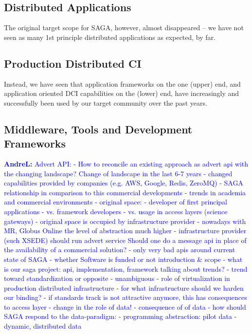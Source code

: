 \documentclass{article}
\newcommand{\B}[1]{\textbf{#1}}
\newcommand{\alnote}[1]{{\textcolor{blue}{    \B{AndreL:  } #1 }}}
\newcommand{\alnote}[1]{}
\begin{document}
\subsection{Distributed Applications}

The original target scope for SAGA, however, almost disappeared -- we
have not seen as many 1st principle distributed applications as
expected, by far.


\subsection{Production Distributed CI}

Instead, we have seen that application frameworks on the one (upper)
end, and application oriented DCI capabilities on the (lower) end,
have increasingly and successfully been used by our target community
over the past years.


\subsection{Middleware, Tools and Development Frameworks}

\alnote{Advert API: - How to reconcile an existing approach as advert
  api with the changing landscape?  Change of landscape in the last
  6-7 years - changed capabilities provided by companies (e.g. AWS,
  Google, Redis, ZeroMQ) - SAGA relationship in comparison to this
  commercial developments - trends in academia and commercial
  environments - original space: - developer of first principal
  applications - vs. framework developers - vs. usage in access layers
  (science gateways) - original space is occupied by infrastructure
  provider - nowadays with MR, Globus Online the level of abstraction
  much higher - infrastructure provider (such XSEDE) should run advert
  service Should one do a message api in place of the availability of
  a commercial solution?  - only very bad apis around current state of
  SAGA - whether Software is funded or not introduction \& scope -
  what is our saga project: api, implementation, framework talking
  about trends?  - trend toward standardization or opposite -
  unambiguous - role of virtualization in production distributed
  infrastructure - for what infrastructure should we harden our
  binding?  - if standards track is not attractive anymore, this has
  consequences to access layer - change in the role of data!  -
  consequence of of data - how should SAGA respond to the
  data-paradigm: - programming abstraction: pilot data - dynamic,
  distributed data }
\end{document}
